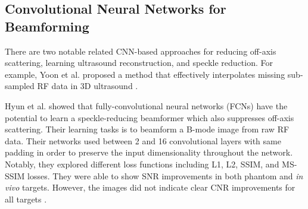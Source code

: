     \subsection{Convolutional Neural Networks for Beamforming}
      There are two notable related CNN-based approaches for reducing off-axis scattering, learning ultrasound reconstruction, and speckle reduction. For example, Yoon et al. proposed a method that effectively interpolates missing sub-sampled RF data in 3D ultrasound \cite{yoon2018efficient}.

      Hyun et al. showed that fully-convolutional neural networks (FCNs) have the potential to learn a speckle-reducing beamformer which also suppresses off-axis scattering. Their learning tasks is to beamform a B-mode image from raw RF data. Their networks used between 2 and 16 convolutional layers with same padding in order to preserve the input dimensionality throughout the network. Notably, they explored different loss functions including L1, L2, SSIM, and MS-SSIM losses. They were able to show SNR improvements in both phantom and \textit{in vivo} targets. However, the images did not indicate clear CNR improvements for all targets \cite{hyun2019beamforming}.
